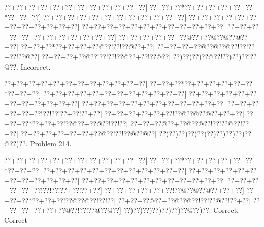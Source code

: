 \documentclass[a5paper]{article}
\begin{document}
\begin{center}
{\goo
\0??+\0??+\0??+\0??+\0??+\0??+\0??+\0??+\0??+\0??+\0??+\0??]
\0??+\0??+\0??*\0??+\0??+\0??+\0??+\0??+\0??*\0??+\0??+\0??]
\0??+\0??+\0??+\0??+\0??+\0??+\0??+\0??+\0??+\0??+\0??+\0??]
\0??+\0??+\0??+\0??+\0??+\0??+\0??+\0??+\0??+\0??+\0??+\0??]
\0??+\0??+\0??+\0??+\0??+\0??+\0??+\0??+\0??+\0??+\0??+\0??]
\0??+\0??+\0??+\0??+\0??+\0??+\0??+\0??+\0??+\0??+\0??+\0??]
\0??+\0??+\0??+\0??+\0??+\0??@\0??+\0??@\0??@\0??@\0??+\0??]
\0??+\0??+\0??*\0??+\0??+\0??+\0??@\0??!\0??!\0??@\0??+\0??]
\0??+\0??+\0??+\0??@\0??@\0??@\0??!\0??!\0??+\0??!\0??@\0??]
\0??+\0??+\0??+\0??@\0??!\0??!\0??!\0??@\0??+\0??!\0??@\0??]
\0??)\0??)\0??)\0??@\0??!\0??)\0??)\0??!\0??@\0??.
}
Incorrect. 

\end{center}
\newpage
\begin{center}
{\goo
\0??+\0??+\0??+\0??+\0??+\0??+\0??+\0??+\0??+\0??+\0??+\0??]
\0??+\0??+\0??*\0??+\0??+\0??+\0??+\0??+\0??*\0??+\0??+\0??]
\0??+\0??+\0??+\0??+\0??+\0??+\0??+\0??+\0??+\0??+\0??+\0??]
\0??+\0??+\0??+\0??+\0??+\0??+\0??+\0??+\0??+\0??+\0??+\0??]
\0??+\0??+\0??+\0??+\0??+\0??+\0??+\0??+\0??+\0??+\0??+\0??]
\0??+\0??+\0??+\0??+\0??+\0??!\0??!\0??!\0??+\0??!\0??+\0??]
\0??+\0??+\0??+\0??+\0??+\0??!\0??@\0??@\0??@\0??+\0??+\0??]
\0??+\0??+\0??*\0??+\0??+\0??!\0??@\0??+\0??@\0??!\0??!\0??]
\0??+\0??+\0??@\0??+\0??@\0??@\0??!\0??!\0??@\0??!\0??+\0??]
\0??+\0??+\0??+\0??+\0??+\0??+\0??@\0??!\0??!\0??@\0??@\0??]
\0??)\0??)\0??)\0??)\0??)\0??)\0??)\0??)\0??)\0??@\0??)\0??.
}
Problem 214.

\end{center}
\begin{center}
{\goo
\0??+\0??+\0??+\0??+\0??+\0??+\0??+\0??+\0??+\0??+\0??+\0??]
\0??+\0??+\0??*\0??+\0??+\0??+\0??+\0??+\0??*\0??+\0??+\0??]
\0??+\0??+\0??+\0??+\0??+\0??+\0??+\0??+\0??+\0??+\0??+\0??]
\0??+\0??+\0??+\0??+\0??+\0??+\0??+\0??+\0??+\0??+\0??+\0??]
\0??+\0??+\0??+\0??+\0??+\0??+\0??+\0??+\0??+\0??+\0??+\0??]
\0??+\0??+\0??+\0??+\0??+\0??!\0??!\0??!\0??+\0??!\0??+\0??]
\0??+\0??+\0??+\0??+\0??+\0??!\0??@\0??@\0??@\0??+\0??+\0??]
\0??+\0??+\0??*\0??+\0??+\0??!\0??@\0??@\0??!\0??!\0??]
\0??+\0??+\0??@\0??+\0??@\0??@\0??!\0??!\0??@\0??!\0??+\0??]
\0??+\0??+\0??+\0??+\0??+\0??@\0??!\0??!\0??@\0??@\0??]
\0??)\0??)\0??)\0??)\0??)\0??)\0??@\0??)\0??.
}
Correct. Correct

\end{center}
\end{document}

